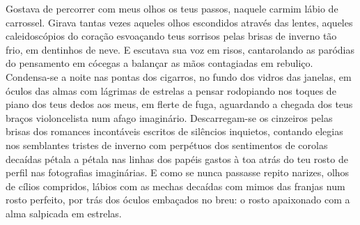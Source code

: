 \Large{Gostava de percorrer com meus olhos os teus passos, naquele carmim lábio de carrossel. Girava tantas vezes aqueles olhos escondidos através das lentes, aqueles caleidoscópios do coração esvoaçando teus sorrisos pelas brisas de inverno tão frio, em dentinhos de neve. E escutava sua voz em risos, cantarolando as paródias do pensamento em cócegas a balançar as mãos contagiadas em rebuliço. Condensa-se a noite nas pontas dos cigarros, no fundo dos vidros das janelas, em óculos das almas com lágrimas de estrelas a pensar rodopiando nos toques de piano dos teus dedos aos meus, em flerte de fuga, aguardando a chegada dos teus braços violoncelista num afago imaginário. Descarregam-se os cinzeiros pelas brisas dos romances incontáveis escritos de silêncios inquietos, contando elegias nos semblantes tristes de inverno com perpétuos dos sentimentos de corolas decaídas pétala a pétala nas linhas dos papéis gastos à toa atrás do teu rosto de perfil nas fotografias imaginárias. E como se nunca passasse repito narizes, olhos de cílios compridos, lábios com as mechas decaídas com mimos das franjas num rosto perfeito, por trás dos óculos embaçados no breu: o rosto apaixonado com a alma salpicada em estrelas.}